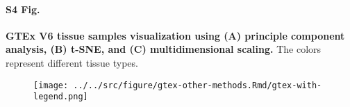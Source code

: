 \documentclass[10pt,letterpaper]{article}
\begin{document}
\paragraph*{S4 Fig.}

\label{figS4}
{\bf GTEx V6 tissue samples visualization using (A) principle component analysis, (B) t-SNE, and (C) multidimensional scaling.}
The colors represent different tissue types.
\begin{figure}[ht]
\centering
\texttt{[image: ../../src/figure/gtex-other-methods.Rmd/gtex-with-legend.png]}
\end{figure}
\end{document}
